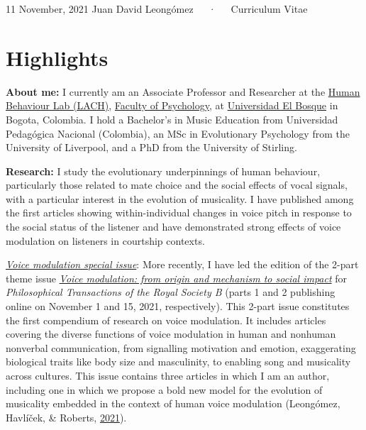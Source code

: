 \documentclass[11pt, a4paper]{awesome-cv}
\begin{document}
\makecvheader

\makecvfooter
  {11 November, 2021}
    {Juan David Leongómez~~~·~~~Curriculum Vitae}
  {\thepage}





\hypertarget{highlights}{%
\section{Highlights}\label{highlights}}

\textbf{About me:} I currently am an Associate Professor and Researcher
at the \href{https://www.psicologia.unbosque.edu.co/lach}{Human
Behaviour Lab (LACH)},
\href{https://www.uelbosque.edu.co/psicologia}{Faculty of Psychology},
at \href{https://www.uelbosque.edu.co/}{Universidad El Bosque} in
Bogota, Colombia. I hold a Bachelor's in Music Education from
Universidad Pedagógica Nacional (Colombia), an MSc in Evolutionary
Psychology from the University of Liverpool, and a PhD from the
University of Stirling.

\textbf{Research:} I study the evolutionary underpinnings of human
behaviour, particularly those related to mate choice and the social
effects of vocal signals, with a particular interest in the evolution of
musicality. I have published among the first articles showing
within-individual changes in voice pitch in response to the social
status of the listener and have demonstrated strong effects of voice
modulation on listeners in courtship contexts.

\underline{\textit{Voice modulation special issue}}: More recently, I
have led the edition of the 2-part theme issue
\href{https://royalsocietypublishing.org/toc/rst\%20b/376/1840}{\textit{Voice modulation: from origin and mechanism to social impact}}
for \emph{Philosophical Transactions of the Royal Society B} (parts 1
and 2 publishing online on November 1 and 15, 2021, respectively). This
2-part issue constitutes the first compendium of research on voice
modulation. It includes articles covering the diverse functions of voice
modulation in human and nonhuman nonverbal communication, from
signalling motivation and emotion, exaggerating biological traits like
body size and masculinity, to enabling song and musicality across
cultures. This issue contains three articles in which I am an author,
including one in which we propose a bold new model for the evolution of
musicality embedded in the context of human voice modulation (Leongómez,
Havlíček, \& Roberts,
\href{https://jdleongomez.info/en/publication/leongomez2021musicality/}{2021}).
\end{document}
